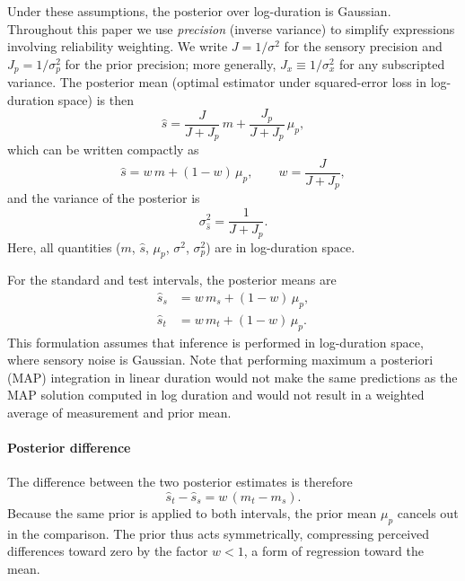 \documentclass{jov}
\begin{document}
Under these assumptions, the posterior over log-duration is Gaussian. Throughout this paper we use \emph{precision} (inverse variance) to simplify expressions involving reliability weighting.  We write $J = 1/\sigma^2$ for the sensory precision and $J_p = 1/\sigma_p^2$ for the prior precision; more generally, $J_x \equiv 1/\sigma_x^2$ for any subscripted variance. The posterior mean (optimal estimator under squared-error loss in log-duration space) is then
\begin{equation}
\hat{s}
=
\frac{J}{J + J_p} \, m
+
\frac{J_p}{J + J_p} \, \mu_p,
\label{eq:posterior_mean}
\end{equation}
which can be written compactly as
\begin{equation}
\hat{s}
=
w\, m + (1-w)\,\mu_p,
\qquad
w = \frac{J}{J + J_p},
\label{eq:posterior_weight}
\end{equation}
and the variance of the posterior is
\begin{equation}
\sigma_{\hat{s}}^2 = \frac{1}{J + J_p}.
\label{eq:posterior_var}
\end{equation}
Here, all quantities ($m$, $\hat{s}$, $\mu_p$, $\sigma^2$, $\sigma_p^2$) are in log-duration space.

For the standard and test intervals, the posterior means are
\begin{align}
\hat{s}_s &= w\, m_s + (1-w)\,\mu_p,
\label{eq:posterior_standard} \\
\hat{s}_t &= w\, m_t + (1-w)\,\mu_p.
\label{eq:posterior_test}
\end{align}
This formulation assumes that inference is performed in log-duration space, where sensory noise is Gaussian. Note that performing maximum a posteriori (MAP) integration in linear duration would not make the same predictions as the MAP solution computed in log duration and would not result in a weighted average of measurement and prior mean.

\paragraph{Posterior difference}

The difference between the two posterior estimates is therefore
\begin{equation}
\hat{s}_t - \hat{s}_s
=
w\,(m_t - m_s).
\label{eq:posterior_difference}
\end{equation}
Because the same prior is applied to both intervals, the prior mean $\mu_p$ cancels out in the comparison. The prior thus acts symmetrically, compressing perceived differences toward zero by the factor $w < 1$, a form of regression toward the mean.
\end{document}
